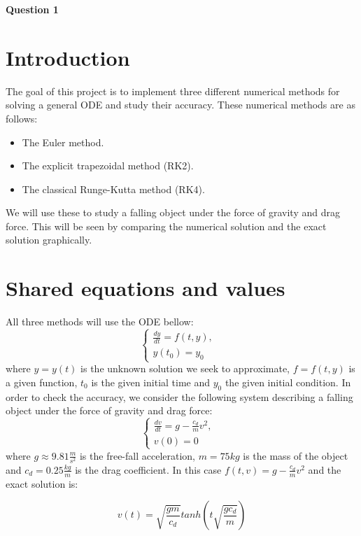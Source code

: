 \documentclass[12pt]{article}
\begin{document}
\centerline{\Large\textbf{Question 1}}
\vspace{2cm}

\section{Introduction}\label{sec::Intro}
The goal of this project is to implement three different numerical methods for solving a general ODE and study their accuracy.  These numerical methods are as follows:
\begin{itemize}
\item The Euler method.
\item The explicit trapezoidal method (RK2).
\item The classical Runge-Kutta method (RK4).
\end{itemize}
We will use these to study a falling object under the force of gravity and drag force.  This will be seen by comparing the numerical solution and the exact solution graphically.  

\section{Shared equations and values}\label{sec::equations and values}
All three methods will use the ODE bellow:
$$
\left\{ \begin{array}{rl}
\frac{dy}{dt} = f(t, y), \mbox{ } \\
y(t_0) = y_0 \mbox{ }
       \end{array} \right.
$$
where $y = y(t)$ is the unknown solution we seek to approximate, $f = f(t, y)$ is a given function,
$t_0$ is the given initial time and $y_0$ the given initial condition.  In order to check the accuracy, we consider the following system describing a falling object under the force of gravity and drag force:
$$
\left\{ \begin{array}{rl}
\frac{dv}{dt}  = g -\frac{c_d}{m}v^2, \mbox{ } \\
v(0) = 0 \mbox{ }
       \end{array} \right.
$$
where $g \approx 9.81\frac{m}{s^2}$ is the free-fall acceleration, $m = 75 kg$ is the mass of the object and
$c_d = 0.25 \frac{kg}{m}$ is the drag coefficient. In this case $f(t, v) = g −\frac{c_d}{m}v^2$ and the exact solution is:

\begin{equation}
v(t)=\sqrt{\frac{gm}{c_d}}tanh(t\sqrt{\frac{gc_d}{m}})\nonumber
\end{equation}
\end{document}
